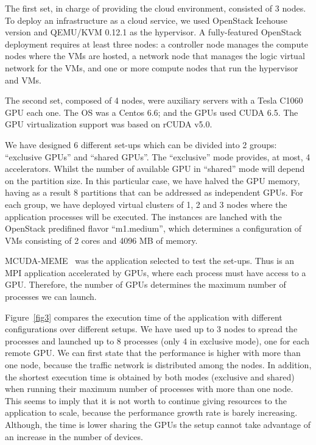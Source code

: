 \documentclass[a4paper,twoside]{article}
\begin{document}
The first set, in charge of providing the cloud environment,
consisted of 3 nodes.
To deploy an infrastructure as a cloud service, we used OpenStack Icehouse version and QEMU/KVM 0.12.1 as the hypervisor.
A fully-featured OpenStack deployment requires at least three nodes: a controller node manages the compute nodes 
where the VMs are hosted, a network node that manages the logic virtual network for the VMs, and one or more compute nodes that 
run the hypervisor and VMs.

The second set, composed of 4 nodes, were auxiliary servers with a Tesla C1060 GPU each one. 
The OS was a Centos 6.6; and the GPUs used CUDA 6.5. 
The GPU virtualization support was based on rCUDA v5.0. 

We have designed 6 different set-ups which can be divided into 2 groups: “exclusive GPUs” and “shared GPUs”. 
The “exclusive” mode provides, at most, 4 accelerators. 
Whilst the number of available GPU in “shared” mode will depend on the partition size. 
In this particular case, we have halved the GPU memory, having as a result 8 partitions that can be addressed as independent GPUs.
For each group, we have deployed virtual clusters of 1, 2 and 3 nodes where the application processes will be executed. 
The instances are lanched with the OpenStack predifined flavor “m1.medium”, which determines a configuration of VMs consisting of 2 cores and 4096 MB of memory.

MCUDA-MEME~\cite{Liu2010} was the application selected to test the set-ups. 
Thus is an MPI application accelerated by GPUs, where each process must have access to a GPU.
Therefore, the number of GPUs determines the maximum number of processes we can launch.

Figure~\ref{fig3} compares the execution time of the application with different configurations over different setups. 
We have used up to 3 nodes to spread the processes and launched up to 8 processes (only 4 in exclusive mode), one for each remote GPU.
We can first state that the performance is higher with more than one node, because the traffic network is distributed among the nodes.
In addition, the shortest execution time is obtained by both modes (exclusive and shared) when running their maximum number of processes with more than one node.
This seems to imply that it is not worth to continue giving resources to the application to scale, because the performance growth rate is barely increasing.
Although, the time is lower sharing the GPUs the setup cannot take advantage of an increase in the number of devices.
\end{document}
